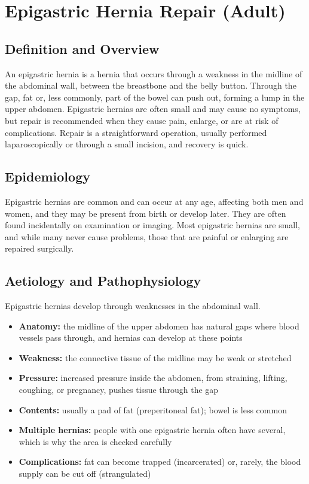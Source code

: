 \chapter{Epigastric Hernia Repair (Adult)}

\section*{Definition and Overview}
An epigastric hernia is a hernia that occurs through a weakness in the midline of the abdominal wall, between the breastbone and the belly button. Through the gap, fat or, less commonly, part of the bowel can push out, forming a lump in the upper abdomen. Epigastric hernias are often small and may cause no symptoms, but repair is recommended when they cause pain, enlarge, or are at risk of complications. Repair is a straightforward operation, usually performed laparoscopically or through a small incision, and recovery is quick.

\section*{Epidemiology}
Epigastric hernias are common and can occur at any age, affecting both men and women, and they may be present from birth or develop later. They are often found incidentally on examination or imaging. Most epigastric hernias are small, and while many never cause problems, those that are painful or enlarging are repaired surgically.

\section*{Aetiology and Pathophysiology}
Epigastric hernias develop through weaknesses in the abdominal wall.
\begin{itemize}
    \item \textbf{Anatomy:} the midline of the upper abdomen has natural gaps where blood vessels pass through, and hernias can develop at these points
    \item \textbf{Weakness:} the connective tissue of the midline may be weak or stretched
    \item \textbf{Pressure:} increased pressure inside the abdomen, from straining, lifting, coughing, or pregnancy, pushes tissue through the gap
    \item \textbf{Contents:} usually a pad of fat (preperitoneal fat); bowel is less common
    \item \textbf{Multiple hernias:} people with one epigastric hernia often have several, which is why the area is checked carefully
    \item \textbf{Complications:} fat can become trapped (incarcerated) or, rarely, the blood supply can be cut off (strangulated)
\end{itemize}

